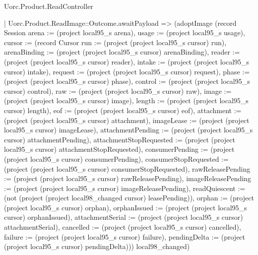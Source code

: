 \begin{lexlean}{Uorc.Product.ReadController}
\begin{semanticmodule}
{      | Uorc.Product.ReadImage::Outcome.awaitPayload => (adoptImage (record Session {arena := (project local95_s arena), usage := (project local95_s usage), cursor := (record Cursor {run := (project (project local95_s cursor) run), arenaBinding := (project (project local95_s cursor) arenaBinding), reader := (project (project local95_s cursor) reader), intake := (project (project local95_s cursor) intake), request := (project (project local95_s cursor) request), phase := (project (project local95_s cursor) phase), control := (project (project local95_s cursor) control), raw := (project (project local95_s cursor) raw), image := (project (project local95_s cursor) image), length := (project (project local95_s cursor) length), eof := (project (project local95_s cursor) eof), attachment := (project (project local95_s cursor) attachment), imageLease := (project (project local95_s cursor) imageLease), attachmentPending := (project (project local95_s cursor) attachmentPending), attachmentStopRequested := (project (project local95_s cursor) attachmentStopRequested), consumerPending := (project (project local95_s cursor) consumerPending), consumerStopRequested := (project (project local95_s cursor) consumerStopRequested), rawReleasePending := (project (project local95_s cursor) rawReleasePending), imageReleasePending := (project (project local95_s cursor) imageReleasePending), readQuiescent := (not (project (project local98_changed cursor) leasePending)), orphan := (project (project local95_s cursor) orphan), orphanIssued := (project (project local95_s cursor) orphanIssued), attachmentSerial := (project (project local95_s cursor) attachmentSerial), cancelled := (project (project local95_s cursor) cancelled), failure := (project (project local95_s cursor) failure), pendingDelta := (project (project local95_s cursor) pendingDelta)})}) local98_changed)
}
\end{semanticmodule}
\end{lexlean}
